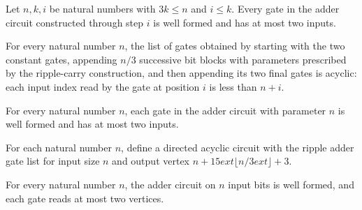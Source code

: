 \begin{theorem}
\label{BoolCircuit.faninTwo_adderGatesUpTo}
\leanok
{}
Let $n,k,i$ be natural numbers with $3k\le n$ and $i\le k$. Every gate in the adder
circuit constructed through step $i$ is well formed and has at most two inputs.
\end{theorem}

\begin{theorem}
\label{BoolCircuit.gatesAcyclic_adderGates}
\leanok
{}
For every natural number $n$, the list of gates obtained by starting with the two
constant gates, appending $n/3$ successive bit blocks with parameters prescribed by the
ripple-carry construction, and then appending its two final gates is acyclic: each input
index read by the gate at position $i$ is less than $n+i$.
\end{theorem}

\begin{theorem}
\label{BoolCircuit.faninTwo_adderGates}
\leanok
{}
For every natural number $n$, each gate in the adder circuit with parameter $n$ is well
formed and has at most two inputs.
\end{theorem}

\begin{definition}
\label{BoolCircuit.adderCircuit}
\leanok
{}
For each natural number $n$, define a directed acyclic circuit with the ripple adder
gate list for input size $n$ and output vertex $n+15	ext{⌊}n/3	ext{⌋}+3$.
\end{definition}

\begin{theorem}
\label{BoolCircuit.adderCircuit_isFaninTwo}
\leanok
{}
For every natural number $n$, the adder circuit on $n$ input bits is well formed, and
each gate reads at most two vertices.
\end{theorem}


